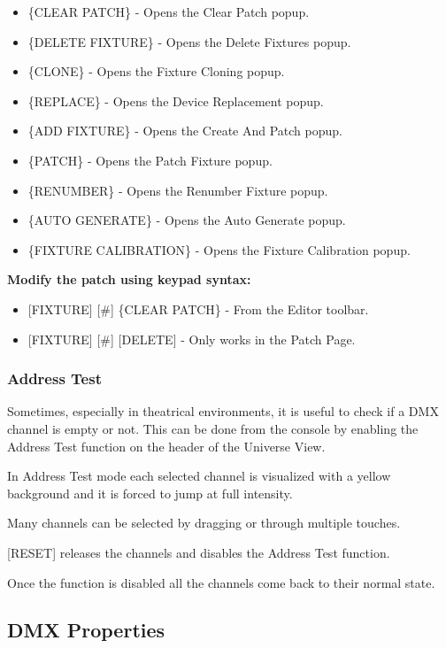 \documentclass[
]{article}
\begin{document}
\begin{itemize}
\item
  \{CLEAR PATCH\} - Opens the Clear Patch popup.
\item
  \{DELETE FIXTURE\} - Opens the Delete Fixtures popup.
\item
  \{CLONE\} - Opens the Fixture Cloning popup.
\item
  \{REPLACE\} - Opens the Device Replacement popup.
\item
  \{ADD FIXTURE\} - Opens the Create And Patch popup.
\item
  \{PATCH\} - Opens the Patch Fixture popup.
\item
  \{RENUMBER\} - Opens the Renumber Fixture popup.
\item
  \{AUTO GENERATE\} - Opens the Auto Generate popup.
\item
  \{FIXTURE CALIBRATION\} - Opens the Fixture Calibration popup.
\end{itemize}

\textbf{Modify the patch using keypad syntax:}

\begin{itemize}
\item
  {[}FIXTURE{]} {[}\#{]} \{CLEAR PATCH\} - From the Editor toolbar.
\item
  {[}FIXTURE{]} {[}\#{]} {[}DELETE{]} - Only works in the Patch Page.
\end{itemize}

\hypertarget{address-test}{%
\subsubsection{Address Test}\label{address-test}}

Sometimes, especially in theatrical environments, it is useful to check if a DMX channel is empty or not. This can be done from the console by enabling the Address Test function on the header of the Universe View.

In Address Test mode each selected channel is visualized with a yellow background and it is forced to jump at full intensity.

Many channels can be selected by dragging or through multiple touches.

{[}RESET{]} releases the channels and disables the Address Test function.

Once the function is disabled all the channels come back to their normal state.

\hypertarget{DMX-Properties-5.4}{%
\subsection{DMX Properties}\label{DMX-Properties-5.4}}
\end{document}
